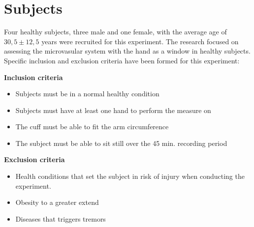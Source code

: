 \section{Subjects}

Four healthy subjects, three male and one female, with the average age of $30,5 \pm 12,5$ years were recruited for this experiment. The research focused on assessing the microvasular system with the hand as a window in healthy subjects. Specific inclusion and exclusion criteria have been formed for this experiment:

\textbf{Inclusion criteria}
\begin{itemize}[noitemsep]
	\item Subjects must be in a normal healthy condition 
	\item Subjects must have at least one hand to perform the measure on
	\item The cuff must be able to fit the arm circumference 
	\item The subject must be able to sit still over the 45 min. recording period 
\end{itemize}

\textbf{Exclusion criteria}
\begin{itemize}[noitemsep]
	\item Health conditions that set the subject in risk of injury when conducting the experiment.
	
	\item Obesity to a greater extend
	\item Diseases that triggers tremors   
\end{itemize} 
